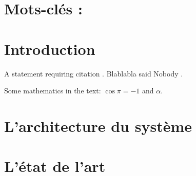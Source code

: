 \documentclass[
10pt, %
a4paper, %
oneside, %
headinclude,footinclude, %
BCOR5mm, %
]{scrartcl}
\begin{document}
\lipsum[1] %


\section*{Mots-clés : }





\newpage %


\section{Introduction}

A statement requiring citation \citet{Figueredo}.
Blablabla said Nobody \citet{Nobody06}.

\lipsum[1-3] %

Some mathematics in the text: $\cos\pi=-1$ and $\alpha$.
 
\newpage 
\section{L'architecture du système}

\lipsum[5] %

\newpage 
\section{L'état de l'art}
\end{document}
